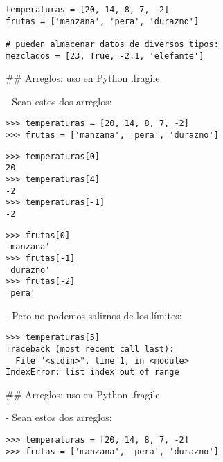 \begin{lstlisting}[style=frame02]
temperaturas = [20, 14, 8, 7, -2]
frutas = ['manzana', 'pera', 'durazno']

# pueden almacenar datos de diversos tipos:
mezclados = [23, True, -2.1, 'elefante']
\end{lstlisting}

## Arreglos: uso en Python {.fragile}

- Sean estos dos arreglos:

\begin{lstlisting}[style=frame03]
>>> temperaturas = [20, 14, 8, 7, -2]
>>> frutas = ['manzana', 'pera', 'durazno']
\end{lstlisting}


\bgncolumns[-3ex]

\begin{lstlisting}[style=frame03]
>>> temperaturas[0]
20
>>> temperaturas[4]
-2
>>> temperaturas[-1]
-2
\end{lstlisting}


\begin{lstlisting}[style=frame03]
>>> frutas[0]
'manzana'
>>> frutas[-1]
'durazno'
>>> frutas[-2]
'pera'
\end{lstlisting}

\trmcolumns

\bgncolumns
{}

- Pero no podemos salirnos de los límites:


\begin{lstlisting}[style=frame03]
>>> temperaturas[5]
Traceback (most recent call last):
  File "<stdin>", line 1, in <module>
IndexError: list index out of range
\end{lstlisting}

\trmcolumns

## Arreglos: uso en Python {.fragile}

- Sean estos dos arreglos:

\begin{lstlisting}[style=frame03]
>>> temperaturas = [20, 14, 8, 7, -2]
>>> frutas = ['manzana', 'pera', 'durazno']
\end{lstlisting}



